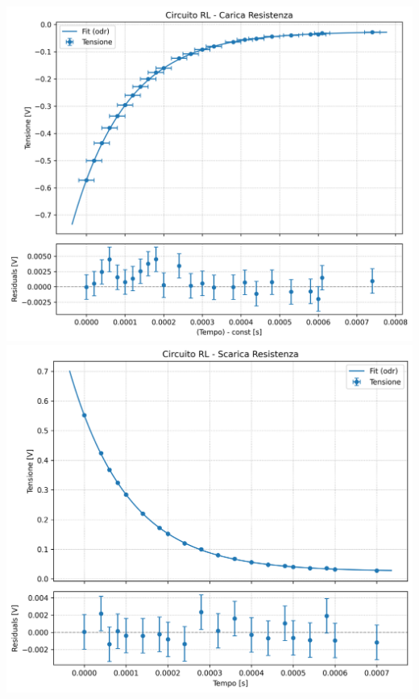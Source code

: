 \documentclass[a4paper]{article}
\begin{document}
\begin{center}
    \label{fig: rl scarica induttore}
    \includegraphics[width=0.9\linewidth]{grafici/rl_carica_resistenza.png}
    \label{fig: rl carica resistenza}
    \includegraphics[width=0.9\linewidth]{grafici/rl_scarica_resistenza.png}
    \label{fig: rl scarica resistenza}
\end{center}
\end{document}
